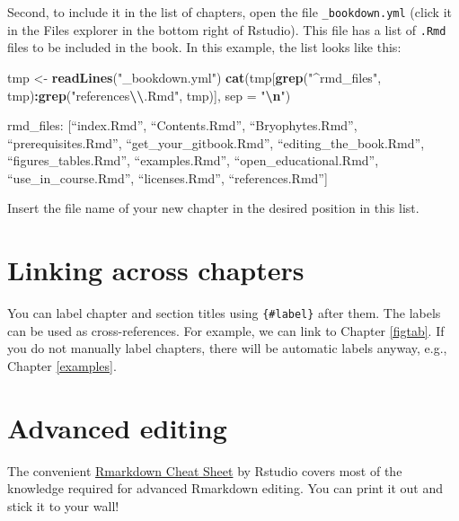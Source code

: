 \documentclass[
]{book}
\newenvironment{Shaded}{\begin{snugshade}}{\end{snugshade}}
\newcommand{\AttributeTok}[1]{\textcolor[rgb]{0.13,0.29,0.53}{#1}}
\newcommand{\FunctionTok}[1]{\textcolor[rgb]{0.13,0.29,0.53}{\textbf{#1}}}
\newcommand{\NormalTok}[1]{#1}
\newcommand{\OtherTok}[1]{\textcolor[rgb]{0.56,0.35,0.01}{#1}}
\newcommand{\SpecialCharTok}[1]{\textcolor[rgb]{0.81,0.36,0.00}{\textbf{#1}}}
\newcommand{\StringTok}[1]{\textcolor[rgb]{0.31,0.60,0.02}{#1}}
\begin{document}
Second, to include it in the list of chapters, open the file \texttt{\_bookdown.yml} (click it in the Files explorer in the bottom right of Rstudio). This file has a list of \texttt{.Rmd} files to be included in the book. In this example, the list looks like this:

\begin{Shaded}
\begin{Highlighting}[]
\NormalTok{tmp }\OtherTok{\textless{}{-}} \FunctionTok{readLines}\NormalTok{(}\StringTok{"\_bookdown.yml"}\NormalTok{)}
\FunctionTok{cat}\NormalTok{(tmp[}\FunctionTok{grep}\NormalTok{(}\StringTok{"\^{}rmd\_files"}\NormalTok{, tmp)}\SpecialCharTok{:}\FunctionTok{grep}\NormalTok{(}\StringTok{"references}\SpecialCharTok{\textbackslash{}\textbackslash{}}\StringTok{.Rmd"}\NormalTok{, tmp)], }\AttributeTok{sep =} \StringTok{"}\SpecialCharTok{\textbackslash{}n}\StringTok{"}\NormalTok{)}
\end{Highlighting}
\end{Shaded}

rmd\_files: {[}``index.Rmd'',
``Contents.Rmd'',
``Bryophytes.Rmd'',
``prerequisites.Rmd'',
``get\_your\_gitbook.Rmd'',
``editing\_the\_book.Rmd'',
``figures\_tables.Rmd'',
``examples.Rmd'',
``open\_educational.Rmd'',
``use\_in\_course.Rmd'',
``licenses.Rmd'',
``references.Rmd''{]}

Insert the file name of your new chapter in the desired position in this list.

\section{Linking across chapters}\label{linking-across-chapters}

You can label chapter and section titles using \texttt{\{\#label\}} after them. The labels can be used as cross-references. For example, we can link to Chapter \ref{figtab}. If you do not manually label chapters, there will be automatic labels anyway, e.g., Chapter \ref{examples}.

\section{Advanced editing}\label{advanced-editing}

The convenient \href{https://rstudio.com/wp-content/uploads/2016/03/rmarkdown-cheatsheet-2.0.pdf}{Rmarkdown Cheat Sheet} by Rstudio covers most of the knowledge required for advanced Rmarkdown editing. You can print it out and stick it to your wall!
\end{document}
